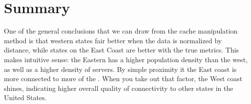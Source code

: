 \section{Summary}

One of the general conclusions that we can draw from the \dns cache manipulation method is that western states fair better when the data is normalized by distance, while states on the East Coast are better with the true \rtt metrics. This makes intuitive sense: the Eastern \us has a higher population density than the west, as well as a higher density of \dns servers. By simple proximity it the East coast is more connected to more of the \us. When you take out that factor, the West coast shines, indicating higher overall quality of \dns connectivity to other states in the United States.